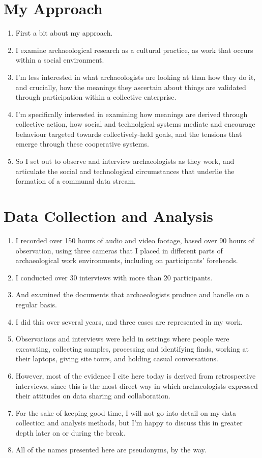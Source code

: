 \documentclass{article}
\begin{document}
\section{My Approach}
\begin{enumerate}
  \item First a bit about my approach.
  \item I examine archaeological research as a cultural practice, as work that occurs within a social environment.
  \item I'm less interested in what archaeologists are looking at than how they do it, and crucially, how the meanings they ascertain about things are validated through participation within a collective enterprise.
  \item I'm specifically interested in examining how meanings are derived through collective action, how social and technolgical systems mediate and encourage behaviour targeted towards collectively-held goals, and the tensions that emerge through these cooperative systems.
  \item So I set out to observe and interview archaeologists as they work, and articulate the social and technological circumstances that underlie the formation of a communal data stream.
\end{enumerate}

\section{Data Collection and Analysis}
\begin{enumerate}
  \item I recorded over 150 hours of audio and video footage, based over 90 hours of observation, using three cameras that I placed in different parts of archaeological work environments, including on participants' foreheads.
  \item I conducted over 30 interviews with more than 20 participants.
  \item And examined the documents that archaeologists produce and handle on a regular basis.
  \item I did this over several years, and three cases are represented in my work.
  \item Observations and interviews were held in settings where people were excavating, collecting samples, processing and identifying finds, working at their laptops, giving site tours, and holding casual conversations.
  \item However, most of the evidence I cite here today is derived from retrospective interviews, since this is the most direct way in which archaeologists expressed their attitudes on data sharing and collaboration.
  \item For the sake of keeping good time, I will not go into detail on my data collection and analysis methods, but I'm happy to discuss this in greater depth later on or during the break.
  \item All of the names presented here are pseudonyms, by the way.
\end{enumerate}
\end{document}
